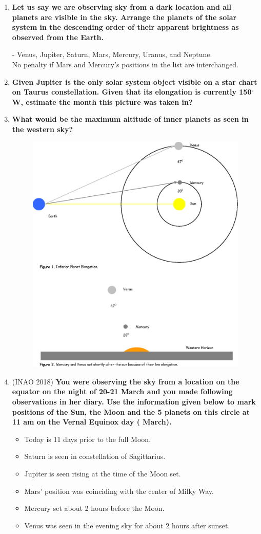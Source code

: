 \documentclass[a4paper,12pt]{extarticle}
\begin{document}
\begin{enumerate}
	\item \textbf{Let us say we are observing sky from a dark location and all planets are visible in the sky. Arrange the planets of the solar system in the descending order of their apparent brightness as observed from the Earth.}
\begin{sol}
	- Venus, Jupiter, Saturn, Mars, Mercury, Uranus, and Neptune.\\
No penalty if Mars and Mercury’s positions in the list are interchanged.	
\end{sol}
	\item \textbf{Given Jupiter is the only solar system object visible on a star chart on Taurus constellation. Given that its elongation is currently 150$^\circ$ W, estimate the month this picture was taken in?}
	\item \textbf{What would be the maximum altitude of inner planets as seen in the western sky?}
	\begin{figure}[H]
		\centering
		\includegraphics[width=0.6\linewidth]{elong_planets.eps}
	\end{figure}

	
	\item (INAO 2018) \textbf{You were observing the sky from a location on the equator on the night of 20-21 March and you made following observations in her diary. Use the information given below to mark positions of the Sun, the Moon and the 5 planets on this circle at 11 am on the Vernal Equinox day ( March).} \label{INAO18}
	\begin{itemize}
		\item Today is 11 days prior to the full Moon.
		\item Saturn is seen in constellation of Sagittarius.
		\item Jupiter is seen rising at the time of the Moon set.
		\item Mars’ position was coinciding with the center of Milky Way.
		\item Mercury set about 2 hours before the Moon.
		\item Venus was seen in the evening sky for about 2 hours after sunset.
	\end{itemize}
\end{enumerate}
\end{document}
